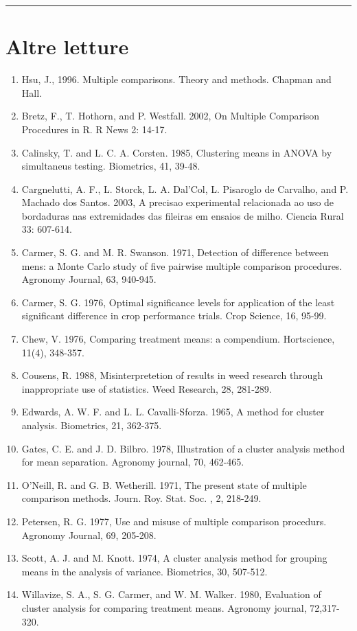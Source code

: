 \documentclass[a4paper,12pt,oneside]{book}
\providecommand{\tightlist}{%
  \setlength{\itemsep}{0pt}\setlength{\parskip}{0pt}}
\begin{document}
\begin{center}\rule{0.5\linewidth}{0.5pt}\end{center}

\hypertarget{altre-letture-8}{%
\section{Altre letture}\label{altre-letture-8}}

\begin{enumerate}
\def\labelenumi{\arabic{enumi}.}
\tightlist
\item
  Hsu, J., 1996. Multiple comparisons. Theory and methods. Chapman and Hall.
\item
  Bretz, F., T. Hothorn, and P. Westfall. 2002, On Multiple Comparison Procedures in R. R News 2: 14-17.
\item
  Calinsky, T. and L. C. A. Corsten. 1985, Clustering means in ANOVA by simultaneus testing. Biometrics, 41, 39-48.
\item
  Cargnelutti, A. F., L. Storck, L. A. Dal'Col, L. Pisaroglo de Carvalho, and P. Machado dos Santos. 2003, A precisao experimental relacionada ao uso de bordaduras nas extremidades das fileiras em ensaios de milho. Ciencia Rural 33: 607-614.
\item
  Carmer, S. G. and M. R. Swanson. 1971, Detection of difference between mens: a Monte Carlo study of five pairwise multiple comparison procedures. Agronomy Journal, 63, 940-945.
\item
  Carmer, S. G. 1976, Optimal significance levels for application of the least significant difference in crop performance trials. Crop Science, 16, 95-99.
\item
  Chew, V. 1976, Comparing treatment means: a compendium. Hortscience, 11(4), 348-357.
\item
  Cousens, R. 1988, Misinterpretetion of results in weed research through inappropriate use of statistics. Weed Research, 28, 281-289.
\item
  Edwards, A. W. F. and L. L. Cavalli-Sforza. 1965, A method for cluster analysis. Biometrics, 21, 362-375.
\item
  Gates, C. E. and J. D. Bilbro. 1978, Illustration of a cluster analysis method for mean separation. Agronomy journal, 70, 462-465.
\item
  O'Neill, R. and G. B. Wetherill. 1971, The present state of multiple comparison methods. Journ. Roy. Stat. Soc. , 2, 218-249.
\item
  Petersen, R. G. 1977, Use and misuse of multiple comparison procedurs. Agronomy Journal, 69, 205-208.
\item
  Scott, A. J. and M. Knott. 1974, A cluster analysis method for grouping means in the analysis of variance. Biometrics, 30, 507-512.
\item
  Willavize, S. A., S. G. Carmer, and W. M. Walker. 1980, Evaluation of cluster analysis for comparing treatment means. Agronomy journal, 72,317-320.
\end{enumerate}
\end{document}
